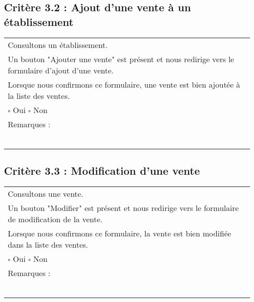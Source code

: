   		
\subsection*{Critère 3.2 : Ajout d'une vente à un établissement }
  		\begin{center}
    	 		\begin{tabular}[h]{|p{}|}
			\hline
				Consultons un établissement. \\
				Un bouton "Ajouter une vente" est présent et nous redirige vers le formulaire d'ajout d'une vente. \\
				Lorsque nous confirmons ce formulaire, une vente est bien ajoutée à la liste des ventes. \\
				
				$\square$ Oui  \hfill \hfill $\square$ Non \\\hline Remarques : \\ ~\\
			 \\\hline
     		\end{tabular}
  		\end{center}	
  		
  		
\subsection*{Critère 3.3 : Modification d'une vente }
  		\begin{center}
    	 		\begin{tabular}[h]{|p{}|}
			\hline
				Consultons une vente. \\
				Un bouton "Modifier" est présent et nous redirige vers le formulaire de modification de la vente. \\
				Lorsque nous confirmons ce formulaire, la vente est bien modifiée dans la liste des ventes. \\%
				
				$\square$ Oui  \hfill \hfill $\square$ Non \\\hline Remarques : \\ ~\\
			 \\\hline
     		\end{tabular}
  		\end{center}	
